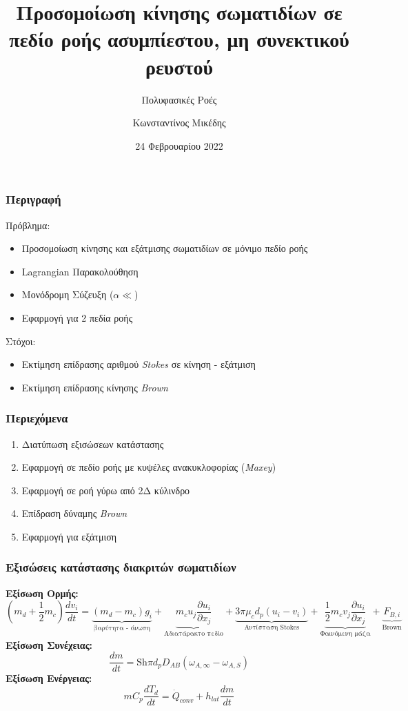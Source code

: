 \documentclass[12pt, hyperref={pdfpagelabels=false},aspectratio=169,fleqn, greek]{beamer}
\title{Προσομοίωση κίνησης σωματιδίων σε πεδίο ροής ασυμπίεστου, μη συνεκτικού ρευστού}
\subtitle{Πολυφασικές Ροές}
\author{Κωνσταντίνος Μικέδης}
\institute[Εθνικό Μετσόβιο Πολυτεχνείο]{}
\date{24 Φεβρουαρίου 2022}
\begin{document}
\begin{frame}
  \titlepage
\end{frame}


\begin{frame}
  \frametitle{Περιγραφή}
  Πρόβλημα:
  \begin{itemize}
    \item Προσομοίωση κίνησης και εξάτμισης σωματιδίων σε μόνιμο πεδίο ροής
    \item Lagrangian Παρακολούθηση
    \item Μονόδρομη Σύζευξη ($\alpha \ll $)
    \item Εφαρμογή για 2 πεδία ροής 
  \end{itemize}
  Στόχοι:
  \begin{itemize}
    \item Εκτίμηση επίδρασης αριθμού \textit{Stokes} σε κίνηση - εξάτμιση 
    \item Εκτίμηση επίδρασης κίνησης \textit{Brown}
  \end{itemize}
\end{frame}

\begin{frame}
  \frametitle{Περιεχόμενα}
  \begin{enumerate}
    \item Διατύπωση εξισώσεων κατάστασης
    \item Εφαρμογή σε πεδίο ροής με κυψέλες ανακυκλοφορίας (\textit{Maxey})
    \item Εφαρμογή σε ροή γύρω από 2Δ κύλινδρο
    \item Επίδραση δύναμης \textit{Brown}
    \item Εφαρμογή για εξάτμιση
  \end{enumerate}
\end{frame}


\begin{frame}
  \frametitle{\large Εξισώσεις κατάστασης διακριτών σωματιδίων}
  \textbf{Εξίσωση Ορμής:}
  \footnotesize
  \begin{equation}
   \left(m_d + \frac{1}{2} m_c \right) \frac{d v_i}{d t } = 
   \underbrace{(m_d - m_c) g_i}_{\text{βαρύτητα - άνωση}} 
   + 
   \underbrace{m_c u_j \frac{\partial u_i}{\partial x_j} }_{\text{Αδιατάρακτο πεδίο}} 
   +
   \underbrace{3 \pi \mu_c d_p \left(u_i - v_i\right)}_{\text{Αντίσταση Stokes}}
    +
   \underbrace{\frac{1}{2} m_c v_j \frac{\partial u_i}{\partial x_j}}_{\text{Φαινόμενη μάζα}} + \underbrace{F_{B,i}}_{\text{Brown}}\nonumber 
  \end{equation}
  \normalsize
  \textbf{Εξίσωση Συνέχειας:}
  \begin{equation*}
    \frac{dm}{dt} = \mathrm{Sh} \pi d_p D_{AB} (\omega_{A,\infty} - \omega_{A,S})
  \end{equation*}
  \textbf{Εξίσωση Ενέργειας:}
  \begin{equation*}
    mC_p\frac{dT_d}{dt} = \dot{Q}_{conv} + h_{lat} \frac{dm}{dt}
  \end{equation*}
\end{frame}
\end{document}
